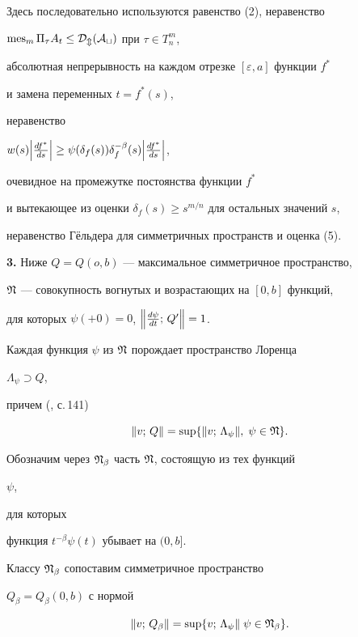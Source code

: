 \begin{pf}
Здесь последовательно используются равенство (2), неравенство 


$\operatorname{mes} _m\Pi_\tau A_t\le \cal D_m(A_t)$ при $\tau\in T_n^m$, 


абсолютная непрерывность на каждом отрезке $[\varepsilon,a]$ функции $f^*$ 


и замена переменных $t=f^*(s)$, 


неравенство 


$w(s)\Bigl|\frac{df^*}{ds}\Bigr|\ge\psi(\delta_f(s))\delta_f^{-\beta}(s) 


\Bigl|\frac{df^*}{ds}\Bigr|$, 


очевидное на промежутке постоянства функции $f^*$ 


и вытекающее из оценки $\delta_f(s)\ge s^{m/n}$ для остальных значений $s$, 


неравенство Г\"ельдера для симметричных пространств и оценка (5). 


\end{pf} 


 


{\bf 3.} Ниже $Q=Q(o,b)$ --- максимальное симметричное пространство, 


$\frak N$ --- совокупность вогнутых и возрастающих на $[0,b]$ функций, 


для которых $\psi(+0)=0$, $\Bigl\|\frac{d\psi}{dt};\,Q'\Bigr\|=1$. 


Каждая функция $\psi$ из $\frak N$ порождает пространство Лоренца 


$\Lambda_\psi\supset Q$, 


причем (\cite{Kre}, с.\,141) 


$$ 


\|v;\,Q\|=\sup\{\|v;\,\Lambda_\psi\|,\;\psi\in\frak N\}. 


$$ 


Обозначим через $\frak N_\beta$ часть $\frak N$, состоящую из тех функций 


$\psi$,


для которых 


функция $t^{-\beta}\psi(t)$ убывает на $(0,b]$. 


Классу $\frak N_\beta$ сопоставим симметричное пространство 


$Q_\beta=Q_\beta(0,b)$ с нормой 


$$ 


\|v;\,Q_\beta\|=\sup\{v;\,\Lambda_\psi\|\;\psi\in\frak N_\beta\}. 


$$ 


